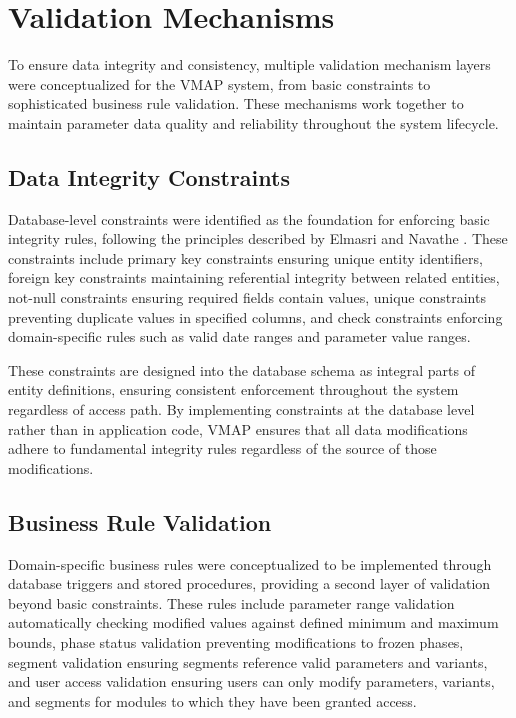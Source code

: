 \section{Validation Mechanisms}
\label{sec:validation-mechanisms}

To ensure data integrity and consistency, multiple validation mechanism layers were conceptualized for the VMAP system, from basic constraints to sophisticated business rule validation. These mechanisms work together to maintain parameter data quality and reliability throughout the system lifecycle.

\subsection{Data Integrity Constraints}
\label{subsec:data-integrity-constraints}

Database-level constraints were identified as the foundation for enforcing basic integrity rules, following the principles described by Elmasri and Navathe \cite{elmasri2015fundamentals}. These constraints include primary key constraints ensuring unique entity identifiers, foreign key constraints maintaining referential integrity between related entities, not-null constraints ensuring required fields contain values, unique constraints preventing duplicate values in specified columns, and check constraints enforcing domain-specific rules such as valid date ranges and parameter value ranges.

These constraints are designed into the database schema as integral parts of entity definitions, ensuring consistent enforcement throughout the system regardless of access path. By implementing constraints at the database level rather than in application code, VMAP ensures that all data modifications adhere to fundamental integrity rules regardless of the source of those modifications.

\subsection{Business Rule Validation}
\label{subsec:business-rule-validation}

Domain-specific business rules were conceptualized to be implemented through database triggers and stored procedures, providing a second layer of validation beyond basic constraints. These rules include parameter range validation automatically checking modified values against defined minimum and maximum bounds, phase status validation preventing modifications to frozen phases, segment validation ensuring segments reference valid parameters and variants, and user access validation ensuring users can only modify parameters, variants, and segments for modules to which they have been granted access.


